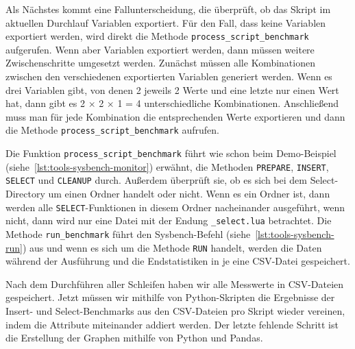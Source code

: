 Als Nächstes kommt eine Fallunterscheidung, die überprüft, ob das Skript im aktuellen Durchlauf Variablen exportiert.
Für den Fall, dass keine Variablen exportiert werden, wird direkt die Methode \texttt{process\_script\_benchmark} aufgerufen.
Wenn aber Variablen exportiert werden, dann müssen weitere Zwischenschritte umgesetzt werden.
Zunächst müssen alle Kombinationen zwischen den verschiedenen exportierten Variablen generiert werden.
Wenn es drei Variablen gibt, von denen 2 jeweils 2 Werte und eine letzte nur einen Wert hat, dann gibt es 2 × 2 × 1 = 4 unterschiedliche Kombinationen.
Anschließend muss man für jede Kombination die entsprechenden Werte exportieren und dann die Methode \texttt{process\_script\_benchmark} aufrufen.

Die Funktion \texttt{process\_script\_benchmark} führt wie schon beim Demo-Beispiel (siehe~\ref{lst:tools-sysbench-monitor}) erwähnt, die Methoden \texttt{PREPARE}, \texttt{INSERT}, \texttt{SELECT} und \texttt{CLEANUP} durch.
Außerdem überprüft sie, ob es sich bei dem Select-Directory um einen Ordner handelt oder nicht.
Wenn es ein Ordner ist, dann werden alle \texttt{SELECT}-Funktionen in diesem Ordner nacheinander ausgeführt, wenn nicht, dann wird nur eine Datei mit der Endung \texttt{\_select.lua} betrachtet.
Die Methode \texttt{run\_benchmark} führt den Sysbench-Befehl (siehe~\ref{lst:tools-sysbench-run}) aus und wenn es sich um die Methode \texttt{RUN} handelt, werden die Daten während der Ausführung und die Endstatistiken in je eine CSV-Datei gespeichert.

\vspace{-8pt}

\vspace{-5pt}

Nach dem Durchführen aller Schleifen haben wir alle Messwerte in CSV-Dateien gespeichert.
Jetzt müssen wir mithilfe von Python-Skripten die Ergebnisse der Insert- und Select-Benchmarks aus den CSV-Dateien pro Skript wieder vereinen, indem die Attribute miteinander addiert werden.
Der letzte fehlende Schritt ist die Erstellung der Graphen mithilfe von Python und Pandas.

%

